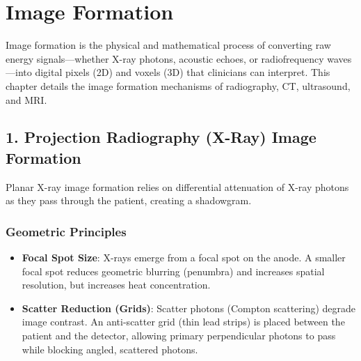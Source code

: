 \chapter{Image Formation}

\label{ch:image_formation}

Image formation is the physical and mathematical process of converting raw energy signals—whether X-ray photons, acoustic echoes, or radiofrequency waves—into digital pixels (2D) and voxels (3D) that clinicians can interpret. This chapter details the image formation mechanisms of radiography, CT, ultrasound, and MRI.


\section*{1. Projection Radiography (X-Ray) Image Formation}
Planar X-ray image formation relies on differential attenuation of X-ray photons as they pass through the patient, creating a shadowgram.

\subsection*{Geometric Principles}
\begin{itemize}
    \item \textbf{Focal Spot Size}: X-rays emerge from a focal spot on the anode. A smaller focal spot reduces geometric blurring (penumbra) and increases spatial resolution, but increases heat concentration.
    \item \textbf{Scatter Reduction (Grids)}: Scatter photons (Compton scattering) degrade image contrast. An anti-scatter grid (thin lead strips) is placed between the patient and the detector, allowing primary perpendicular photons to pass while blocking angled, scattered photons.
\end{itemize}

